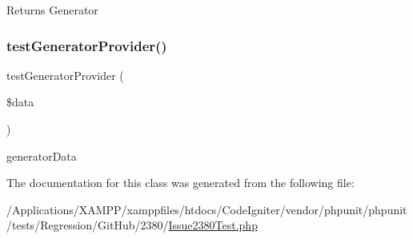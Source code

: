 \begin{DoxyReturn}{Returns}
Generator 
\end{DoxyReturn}
\mbox{\label{class_issue2380_test_a249cdeedb94e6ee58c820b40da54bfe4}} 
\subsubsection{\texorpdfstring{test\+Generator\+Provider()}{testGeneratorProvider()}}
{\footnotesize\ttfamily test\+Generator\+Provider (\begin{DoxyParamCaption}\item[{}]{\$data }\end{DoxyParamCaption})}

generator\+Data 

The documentation for this class was generated from the following file\+:\begin{DoxyCompactItemize}
\item 
/\+Applications/\+X\+A\+M\+P\+P/xamppfiles/htdocs/\+Code\+Igniter/vendor/phpunit/phpunit/tests/\+Regression/\+Git\+Hub/2380/\mbox{\hyperlink{_issue2380_test_8php}{Issue2380\+Test.\+php}}\end{DoxyCompactItemize}
